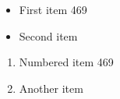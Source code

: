 \documentclass{article}
\begin{document}
\begin{itemize}
\item First item 469
\item Second item
\end{itemize}
\begin{enumerate}
\item Numbered item 469
\item Another item
\end{enumerate}
\end{document}
